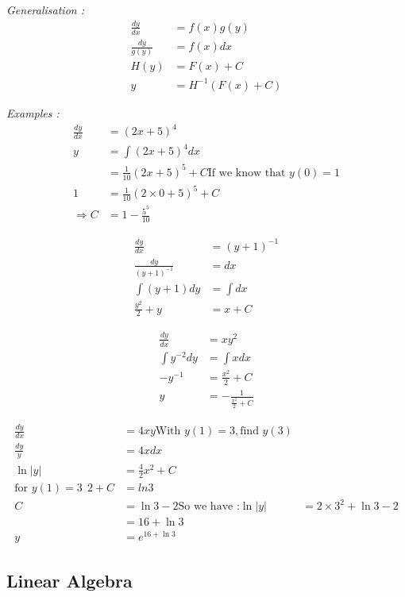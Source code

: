 \documentclass{article}
\begin{document}
    \textit{Generalisation :}
    \begin{align*}
        \frac{dy}{dx} &= f(x)g(y)\\
        \frac{dy}{g(y)} &= f(x)dx\\
        H(y) &= F(x) +C \\
        y &= H^{-1}(F(x)+C)
    \end{align*}

    \textit{Examples :}
    \begin{align*}
        \frac{dy}{dx} &= (2x+5)^4\\
        y &= \int (2x+5)^4 dx\\
        &= \frac{1}{10}(2x+5)^5 +C \text{If we know that }y(0)=1\\
        1 &= \frac{1}{10}(2\times 0 + 5)^5 +C \\
        \Rightarrow C &= 1-\frac{5^5}{10}
    \end{align*}

    \begin{align*}
        \frac{dy}{dx}&=(y+1)^{-1}\\
        \frac{dy}{(y+1)^{-1}} &= dx\\
        \int (y+1)dy &= \int dx\\
         \frac{y^2}{2}+y &= x + C
    \end{align*}

    \begin{align*}
        \frac{dy}{dx} &= xy^2\\
        \int y^{-2}dy &= \int xdx\\
        -y^{-1} &= \frac{x^2}{2} +C\\
        y &= - \frac{1}{\frac{x^2}{2}+C}
    \end{align*}

    \begin{align*}
        \frac{dy}{dx} &= 4xy \text{With }y(1)=3, \text{find } y(3)\\
        \frac{dy}{y} &= 4x dx\\
        \ln |y| &= \frac{4}{2}x^2 +C\\
        \text{for }y(1)=3 ~~ 2+C &= ln 3 \\
        C &= \ln 3 -2
        \text{So we have :} \ln |y| &= 2 \times 3^2 + \ln 3 -2\\
        &= 16 + \ln 3\\
        y &= e^{16 + \ln 3}  
    \end{align*}



    \subsection{Linear Algebra}
\end{document}
